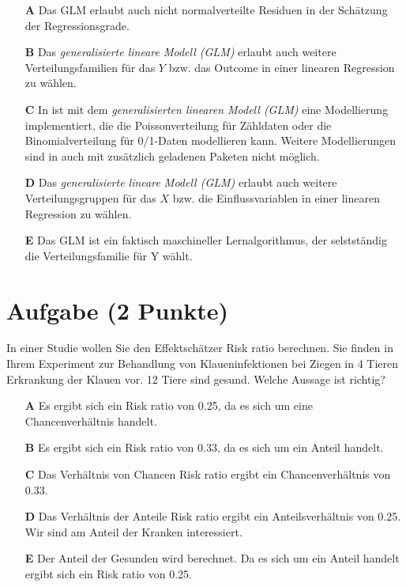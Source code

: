 \documentclass[a4paper, 9pt]{scrartcl}\usepackage[]{graphicx}\usepackage[]{xcolor}
\begin{document}
\begin{enumerate}
\item [\textbf{A} \msquare] Das GLM erlaubt auch nicht normalverteilte Residuen in der Schätzung der Regressionsgrade.
\item [\textbf{B} \msquare] Das \textit{generalisierte lineare Modell (GLM)} erlaubt auch weitere Verteilungsfamilien für das $Y$ bzw. das Outcome in einer linearen Regression zu wählen.
\item [\textbf{C} \msquare] In \Rlogo ist mit dem \textit{generalisierten linearen Modell (GLM)} eine Modellierung implementiert, die die Poissonverteilung für Zähldaten oder die Binomialverteilung für 0/1-Daten modellieren kann. Weitere Modellierungen sind in \Rlogo auch mit zusätzlich geladenen Paketen nicht möglich.
\item [\textbf{D} \msquare] Das \textit{generalisierte lineare Modell (GLM)} erlaubt auch weitere Verteilungsgruppen für das $X$ bzw. die Einflussvariablen in einer linearen Regression zu wählen.
\item [\textbf{E} \msquare] Das GLM ist ein faktisch maschineller Lernalgorithmus, der selstständig die Verteilungsfamilie für Y wählt.
\end{enumerate}

\section{Aufgabe \hfill (2 Punkte)}

\ifcollection
\begin{flushright}
\tiny\vspace{-2Ex}
\textbf{\examinhaltstart}
\exammodulebiostat
\vspace{-1Ex}
\end{flushright}
\fi




In einer Studie wollen Sie den Effektschätzer Risk ratio berechnen. Sie finden in Ihrem Experiment zur Behandlung von Klaueninfektionen bei Ziegen in 4 Tieren Erkrankung der Klauen vor. 12 Tiere sind gesund. Welche Aussage ist richtig?



\begin{enumerate}
\item [\textbf{A} \msquare] Es ergibt sich ein Risk ratio von 0.25, da es sich um eine Chancenverhältnis handelt.
\item [\textbf{B} \msquare] Es ergibt sich ein Risk ratio von 0.33, da es sich um ein Anteil handelt.
\item [\textbf{C} \msquare] Das Verhältnis von Chancen Risk ratio ergibt ein Chancenverhältnis von 0.33.
\item [\textbf{D} \msquare] Das Verhältnis der Anteile Risk ratio ergibt ein Anteilsverhältnis von 0.25. Wir sind am Anteil der Kranken interessiert.
\item [\textbf{E} \msquare] Der Anteil der Gesunden wird berechnet. Da es sich um ein Anteil handelt ergibt sich ein Risk ratio von 0.25.
\end{enumerate}
    
\end{document}

